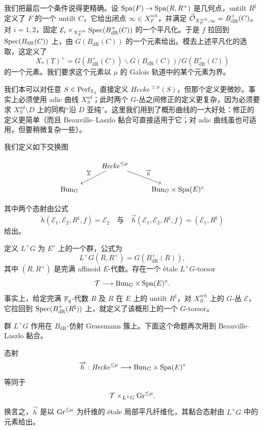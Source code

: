 我们把最后一个条件说得更精确。设 $\mathrm{Spa}(F)\to\mathrm{Spa}(R,R^+)$ 是几何点，untilt $R^\sharp$ 定义了 $F$ 的一个 untilt $C$，它给出闭点 $\infty\in X_F^{sch}$，并满足 $\widehat{\mathcal{O}}_{X_F^{sch},\infty}=B_{\mathrm{dR}}^+(C)$。对 $i=1,2$，固定 $\mathcal{E}_i\times_{X_F^{sch}}\operatorname{Spec}(B_{\mathrm{dR}}^+(C))$ 的一个平凡化。于是 $f$ 拉回到 $\operatorname{Spec}(B_{\mathrm{dR}}(C))$ 上，由 $G(B_{\mathrm{dR}}(C))$ 的一个元素给出。模去上述平凡化的选取，这定义了
\[
  X_*(T)^+=G(B_{\mathrm{dR}}^+(C))\backslash G(B_{\mathrm{dR}}(C))/G(B_{\mathrm{dR}}^+(C))
\]
的一个元素。我们要求这个元素以 $\mu$ 的 Galois 轨道中的某个元素为界。

\begin{remark}\label{rem:3.18}
我们本可以对任意 $S\in\mathrm{Perf}_{\mathbb{F}_q}$ 直接定义 $\mathit{Hecke}^{\le\mu}(S)$，但那个定义更微妙。事实上必须使用 adic 曲线 $X_S^{ad}$；此时两个 $G$-丛之间修正的定义更复杂，因为必须要求 $X_S^{ad}\setminus D$ 上的同构“沿 $D$ 亚纯”。这里我们用到了概形曲线的一大好处：修正的定义更简单（而且 Beauville–Laszlo 黏合可直接适用于它；对 adic 曲线虽也可适用，但要稍微复杂一些）。
\end{remark}

\begin{definition}\label{def:3.19}
我们定义如下交换图

\[
\begin{tikzcd}
  & \mathit{Hecke}^{\le\mu} \arrow[dl, "\overleftarrow{h}"'] \arrow[dr, "\overrightarrow{h}"] & \\
  \Bun_G & & \Bun_G\times\Spa(E)^{\diamond}
\end{tikzcd}
\]

其中两个态射由公式
\[
  \overleftarrow{h}(\mathcal{E}_1,\mathcal{E}_2,R^\sharp,f)=\mathcal{E}_2
  \quad\text{与}\quad
  \overrightarrow{h}(\mathcal{E}_1,\mathcal{E}_2,R^\sharp,f)=(\mathcal{E}_1,R^\sharp)
\]
给出。
\end{definition}

定义 $L^+G$ 为 $E^{\diamond}$ 上的一个群，公式为
\[
  L^+G(R,R^+)=G(B_{\mathrm{dR}}^+(R)),
\]
其中 $(R,R^+)$ 是完满 affinoid $E$-代数。存在一个 étale $L^+G$-torsor
\[
  \mathcal{T}\longrightarrow\mathrm{Bun}_G\times\mathrm{Spa}(E)^{\diamond}.
\]
事实上，给定完满 $\mathbb{F}_q$-代数 $R$ 及 $R$ 在 $E$ 上的 untilt $R^\sharp$，对 $X_R^{sch}$ 上的 $G$-丛 $\mathcal{E}$，它拉回到 $\operatorname{Spec}(B_{\mathrm{dR}}^+(R^\sharp))$ 上，就定义了该概形上的一个 $G$-torsor。

群 $L^+G$ 作用在 $B_{\mathrm{dR}}$-仿射 Grassmann 簇上。下面这个命题再次用到 Beauville–Laszlo 黏合。

\begin{proposition}\label{prop:3.20}
态射
\[
  \overrightarrow{h}:\mathit{Hecke}^{\le\mu}\longrightarrow\mathrm{Bun}_G\times\mathrm{Spa}(E)^{\diamond}
\]
等同于
\[
  \mathcal{T}\times_{L^+G}\mathrm{Gr}^{\le\mu}.
\]
换言之，$\overrightarrow{h}$ 是以 $\mathrm{Gr}^{\le\mu}$ 为纤维的 étale 局部平凡纤维化，其黏合态射由 $L^+G$ 中的元素给出。
\end{proposition}

